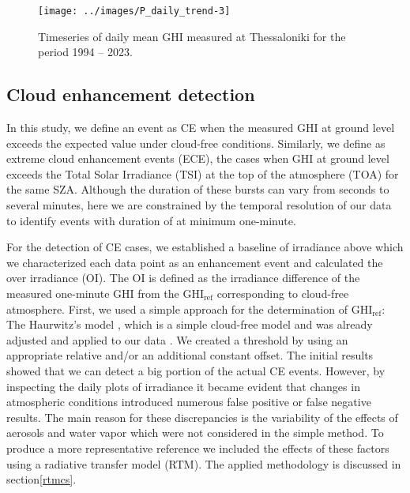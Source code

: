 \documentclass[preprint, 5p,
authoryear]{elsarticle} %
\begin{document}
\begin{figure}

{\centering \texttt{[image: ../images/P\_daily\_trend-3]} 

}

\caption{Timeseries of daily mean GHI measured at Thessaloniki for the period 1994 -- 2023.}\label{fig:CLB-daily}
\end{figure}

\hypertarget{cloud-enhancement-detection}{%
\subsection{Cloud enhancement
detection}\label{cloud-enhancement-detection}}

In this study, we define an event as CE when the measured GHI at ground
level exceeds the expected value under cloud-free conditions. Similarly,
we define as extreme cloud enhancement events (ECE), the cases when GHI
at ground level exceeds the Total Solar Irradiance (TSI) at the top of
the atmosphere (TOA) for the same SZA. Although the duration of these
bursts can vary from seconds to several minutes, here we are constrained
by the temporal resolution of our data to identify events with duration
of at minimum one-minute.

For the detection of CE cases, we established a baseline of irradiance
above which we characterized each data point as an enhancement event and
calculated the over irradiance (OI). The OI is defined as the irradiance
difference of the measured one-minute GHI from the
\(\text{GHI}_\text{ref}\) corresponding to cloud-free atmosphere. First,
we used a simple approach for the determination of
\(\text{GHI}_\text{ref}\): The Haurwitz's model \citep{Haurwitz1945},
which is a simple cloud-free model and was already adjusted and applied
to our data \citep{Natsis2023}. We created a threshold by using an
appropriate relative and/or an additional constant offset. The initial
results showed that we can detect a big portion of the actual CE events.
However, by inspecting the daily plots of irradiance it became evident
that changes in atmospheric conditions introduced numerous false
positive or false negative results. The main reason for these
discrepancies is the variability of the effects of aerosols and water
vapor which were not considered in the simple method. To produce a more
representative reference we included the effects of these factors using
a radiative transfer model (RTM). The applied methodology is discussed
in section\nobreakspace{}\ref{rtmcs}.
\end{document}
